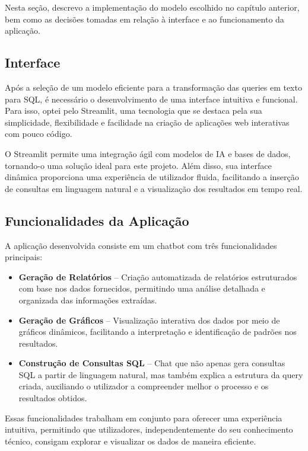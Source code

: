 \documentclass{article}
\begin{document}
\hspace*{1em} Nesta seção, descrevo a implementação do modelo escolhido no capítulo anterior, bem como as decisões tomadas em relação à interface e ao funcionamento da aplicação.


\subsection{Interface}
\hspace*{1em} Após a seleção de um modelo eficiente para a transformação das queries em texto para SQL, é necessário o desenvolvimento de uma interface intuitiva e funcional. Para isso, optei pelo Streamlit, uma tecnologia que se destaca pela sua simplicidade, flexibilidade e facilidade na criação de aplicações web interativas com pouco código.

O Streamlit permite uma integração ágil com modelos de IA e bases de dados, tornando-o uma solução ideal para este projeto. Além disso, sua interface dinâmica proporciona uma experiência de utilizador fluida, facilitando a inserção de consultas em linguagem natural e a visualização dos resultados em tempo real.


\subsection{Funcionalidades da Aplicação}
A aplicação desenvolvida consiste em um chatbot com três funcionalidades principais:

\begin{itemize}
    \item \textbf{Geração de Relatórios} – Criação automatizada de relatórios estruturados com base nos dados fornecidos, permitindo uma análise detalhada e organizada das informações extraídas.
    \item \textbf{Geração de Gráficos} – Visualização interativa dos dados por meio de gráficos dinâmicos, facilitando a interpretação e identificação de padrões nos resultados.
    \item \textbf{Construção de Consultas SQL }– Chat que não apenas gera consultas SQL a partir de linguagem natural, mas também explica a estrutura da query criada, auxiliando o utilizador a compreender melhor o processo e os resultados obtidos.
\end{itemize}

Essas funcionalidades trabalham em conjunto para oferecer uma experiência intuitiva, permitindo que utilizadores, independentemente do seu conhecimento técnico, consigam explorar e visualizar os dados de maneira eficiente.
\end{document}
